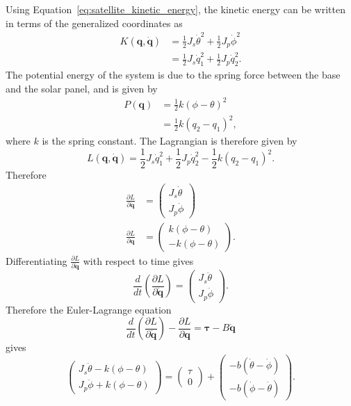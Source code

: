 Using Equation~\eqref{eq:satellite_kinetic_energy}, the kinetic energy can be written in terms of the generalized coordinates as
\begin{align*}
K(\mathbf{q},\dot{\mathbf{q}}) &= \frac{1}{2} J_s \dot{\theta}^2 + \frac{1}{2} J_p \dot{\phi}^2 \\
&= \frac{1}{2} J_s \dot{q}_1^2 + \frac{1}{2} J_p \dot{q}_2^2.
\end{align*}
The potential energy of the system is due to the spring force between the base and the solar panel, and is given by
\begin{align*}
P(\mathbf{q}) &= \frac{1}{2} k (\phi-\theta)^2 \\
&= \frac{1}{2} k (q_2-q_1)^2,
\end{align*}
where $k$ is the spring constant. 
The Lagrangian is therefore given by
\[
L(\mathbf{q},\dot{\mathbf{q}}) = \frac{1}{2} J_s \dot{q}_1^2 + \frac{1}{2} J_p \dot{q}_2^2 - \frac{1}{2} k (q_2-q_1)^2.
\]
Therefore
\begin{align*}
\frac{\partial L}{\partial\dot{\mathbf{q}}} &= \begin{pmatrix} 
J_s\dot{\theta} \\
J_p\dot{\phi}
\end{pmatrix} \\
\frac{\partial L}{\partial\mathbf{q}} &= \begin{pmatrix}
k(\phi-\theta) \\
-k(\phi-\theta)
\end{pmatrix}.
\end{align*}
Differentiating $\frac{\partial L}{\partial \dot{\mathbf{q}}}$ with respect to time gives
\[
\frac{d}{dt}\left(\frac{\partial L}{\partial \dot{\mathbf{q}}}\right) = \begin{pmatrix} 
J_s\ddot{\theta} \\
J_p\ddot{\phi}
\end{pmatrix}.
\]
Therefore the Euler-Lagrange equation
\[
\frac{d}{dt}\left(\frac{\partial L}{\partial\dot{\mathbf{q}}} \right) - \frac{\partial L}{\partial \mathbf{q}} =  \boldsymbol{\tau} -B\dot{\mathbf{q}}
\]
gives
\[
\begin{pmatrix}
J_s\ddot{\theta} - k(\phi-\theta) \\
J_p\ddot{\phi} + k(\phi-\theta)
\end{pmatrix}
=  \begin{pmatrix} \tau \\ 0 \end{pmatrix} + \begin{pmatrix} -b(\dot{\theta}-\dot{\phi}) \\ -b(\dot{\phi}-\dot{\theta}) \end{pmatrix}.
\]

